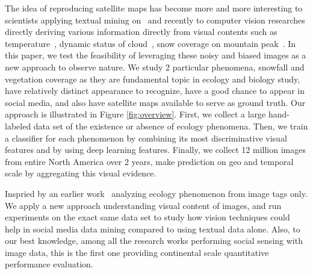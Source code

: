 The idea of reproducing satellite maps has become more and more interesting to scientists applying 
textual mining on~\cite{bollen11twitter,ecology2012www,you2015multifacetedelections,wood2013usingtourism} 
and recently to computer vision researches directly deriving various information directly from visual contents such as
 temperature~\cite{glasner2015hot}, dynamic status of cloud~\cite{murdock}, snow coverage on mountain peak~\cite{fedorov2015snowwatch, fedorov2014snow}.
In this paper, we test the feasibility of leveraging these noisy and biased images as a new 
approach to observe nature. We study 2 particular phenomena, snowfall and vegetation 
coverage as they are fundamental topic in ecology and biology study, have relatively 
distinct appearance to recognize, have a good chance to appear in social media, 
and also have satellite maps available to serve as ground truth. Our approach is 
illustrated in Figure \ref{fig:overview}. 
First, we collect a large hand-labeled data set of the existence or absence of ecology phenomena. 
Then, we train a classifier for each phenomenon by combining its most discriminative visual 
features and by using deep learning features. 
Finally, we collect 12 million images from entire North America over 2 years, make prediction 
on geo and temporal scale by aggregating this visual evidence.

Inspried by an earlier work~\cite{ecology2012www} 
analyzing ecology phenomenon from image tags only. We apply a new approach 
understanding visual content of images, and run experiments on the exact same 
data set to study how vision techniques could help in social media data mining 
compared to using textual data alone. Also, to our best knowledge, among all the 
research works performing social sensing with image data, this is the first one 
providing continental scale quantitative performance evaluation.


